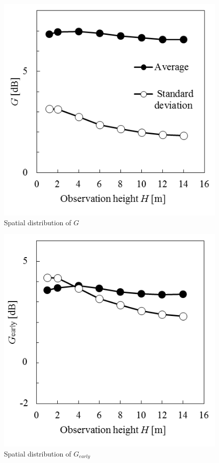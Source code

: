 \begin{figure}[htbp]
    \centering
    \includegraphics[keepaspectratio,scale=1]{04_att/G.png}
    \caption{\hspace{1mm}Spatial distribution of $G$}
    \label{fig:G}
\end{figure}

\begin{figure}[htbp]
    \centering
    \includegraphics[keepaspectratio,scale=1]{04_att/Ge.png}
    \caption{\hspace{1mm}Spatial distribution of $G_{early}$}
    \label{fig:Ge}
\end{figure}

